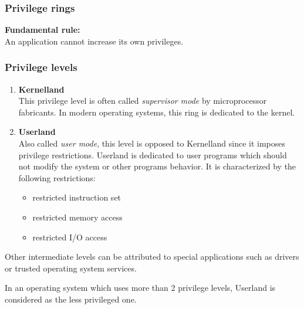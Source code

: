 %
%
%

\begin{frame}
  \frametitle{Privilege rings}

  \begin{center}
  \end{center}

  \nl

  {\bf Fundamental rule:}\\
  An application cannot increase its own privileges.

\end{frame}

%
%
%

\begin{frame}
  \frametitle{Privilege levels}

  \begin{enumerate}
  \item {\bf Kernelland}\\
    This privilege level is often called {\em supervisor mode} by microprocessor
    fabricants. In modern operating systems, this ring is dedicated to the kernel.

    \nl

  \item {\bf Userland}\\
    Also called {\em user mode}, this level is opposed to Kernelland since it
    imposes privilege restrictions. Userland is dedicated to user programs
    which should not modify the system or other programs behavior. It is
    characterized by the following restrictions:

    \begin{itemize}
      \item restricted instruction set
      \item restricted memory access
      \item restricted I/O access
    \end{itemize}
  \end{enumerate}

  \nl

  Other intermediate levels can be attributed to special applications such as
  drivers or trusted operating system services.

  \nl

  In an operating system which uses more than 2 privilege levels, Userland is
  considered as the less privileged one.

\end{frame}

